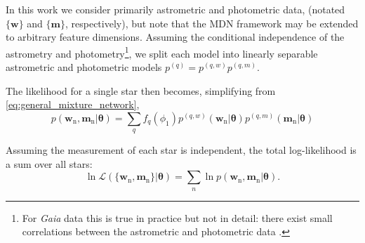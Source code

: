 \documentclass[twocolumn, linenumbers]{aastex631}
\newcommand{\dataarchive}[1]{\textit{#1}}
\newcommand{\Gaia}{\dataarchive{Gaia}}
\newcommand{\mrm}[1]{\mathrm{#1}}
\newcommand{\mbs}[1]{\boldsymbol{#1}}
\newcommand{\mcal}[1]{\mathcal{#1}}
\newcommand{\pdf}{p}
\newcommand{\nth}[1]{{#1}_{\mrm{n}}}  %
\newcommand{\smallcomponent}[2]{#2^{\scriptscriptstyle (#1)}}
\newcommand{\cmp}[2]{\smallcomponent{#1}{#2}}
\begin{document}
        In this work we consider primarily astrometric and photometric data,
        (notated $\{\mbs{w}\}$ and $\{\mbs{m}\}$, respectively), but note that
        the MDN framework may be extended to arbitrary feature dimensions.
        Assuming the conditional independence of the astrometry and
        photometry\footnote{ For \Gaia{} data this is true in practice but not
        in detail: there exist small correlations between the astrometric and
        photometric data \citep[see e.g. the \href{https://www.cosmos.esa.int/web/gaia/science-performance\#astrometric\%20performance}{\Gaia{} website} or][]{GaiaDR2Astrometry2018}.}, we split each model into linearly separable
        astrometric and photometric models $\cmp{q}{\pdf} = \cmp{q,w}{\pdf}
        \cmp{q,m}{\pdf}$.

        The likelihood for a single star then becomes, simplifying from
        \autoref{eq:general_mixture_network},
        \begin{equation} \label{eq:general_model}
            \!\!\!\!\! \pdf(\nth{\mbs{w}}, \! \nth{\mbs{m}} | \mbs{\theta})
                \!=\! \sum_{q} \! f_q(\phi_1) \cmp{q,w}{\pdf}(\nth{\mbs{w}}|\mbs{\theta}) \cmp{q,m}{\pdf}(\nth{\mbs{m}}|\mbs{\theta})
        \end{equation}

        Assuming the measurement of each star is independent, the total
        log-likelihood is a sum over all stars:
        \begin{equation} \label{eq:general_likelihood}
            \ln\mcal{L}\left(\{\nth{\mbs{w}},\nth{\mbs{m}}\} | \mbs{\theta}\right) = \sum_n \ln \pdf(\nth{\mbs{w}}, \nth{\mbs{m}} | \mbs{\theta}).
        \end{equation}
\end{document}
